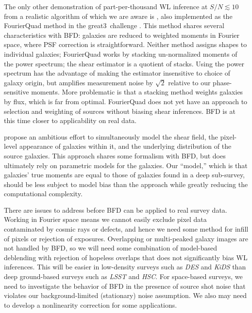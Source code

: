 \documentclass[11pt,preprint,flushrt]{aastex}
\newcommand{\great}{{\sc great3}}
\newcommand\edit[1]{#1}
\begin{document}
The only other demonstration of part-per-thousand WL inference at
$S/N\lesssim10$ from a
realistic algorithm of which we are aware is \citet{zlf}, also
implemented as the {\sc FourierQuad} method in the \great\ challenge
\citep{great3}. This method shares several characteristics with BFD:
galaxies are reduced to weighted moments in Fourier space, where PSF
correction is straightforward.  Neither method assigns shapes to
individual galaxies; {\sc FourierQuad} works by stacking un-normalized
moments of the power spectrum; the shear estimator is a quotient of
stacks.  Using the power spectrum has the advantage of making the 
estimator insensitive to choice of galaxy origin, but amplifies
measurement noise by $\sqrt{2}$ relative to our phase-sensitive moments.  More
problematic is that a stacking method weights galaxies by flux,
which is far from optimal.  {\sc FourierQuad} does not yet have an
approach to selection and weighting of sources without biasing shear
inferences.  BFD is at this time closer to applicability on real data.

\citet{Schneider} propose an ambitious effort to simultaneously model
the shear field, the pixel-level appearance of galaxies within it, and
the underlying distribution of the source galaxies.  This approach
shares some formalism with BFD, but does ultimately rely on parametric
models for the galaxies.  \edit{Our ``model,'' which is that galaxies'
  true moments are equal to those of galaxies found in a deep sub-survey,
 should be less subject to model bias than the \citet{Schneider} approach
while greatly reducing the computational complexity.}

There are issues to address before BFD can be applied to real survey
data.  Working in Fourier space means we cannot easily exclude
pixel data contaminated by cosmic rays or defects, and hence we need
some method for infill of pixels or rejection of exposures.
Overlapping or multi-peaked galaxy images are not handled by BFD, so
we will need some combination of model-based deblending with rejection
of hopeless overlaps that does not significantly bias WL
inferences.  This will be easier in low-density surveys such
as \emph{DES} and \emph{KiDS} than deep ground-based surveys such as
\emph{LSST} and \emph{HSC}.  For space-based surveys, we need to
investigate the behavior of BFD in the presence of source shot noise
that violates our background-limited (stationary) noise assumption.
We also may need to develop a nonlinearity correction for some applications.
\end{document}
